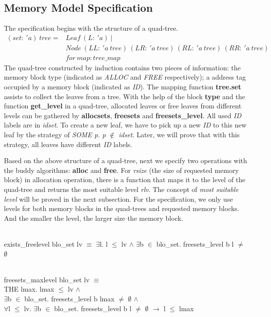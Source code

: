 \subsection{Memory Model Specification}
The specification begins with the structure of a quad-tree.
\begin{align*}
(set:\ 'a)\ tree = &Leaf\ (L:\ 'a)\ | \\
&Node\ (LL:\ 'a\ tree)\ (LR:\ 'a\ tree)\ (RL:\ 'a\ tree)\ (RR:\ 'a\ tree) \\
&for\ map: tree\_map
\end{align*}
The quad-tree constructed by induction contains two pieces of information: the memory block type (indicated as \emph{ALLOC} and \emph{FREE} respectively); a address tag occupied by a memory block (indicated as \emph{ID}). The mapping function \textbf{tree.set} assists to collect the leaves from a tree. With the help of the block \textbf{type} and the function \textbf{get\_level} in a quad-tree, allocated leaves or free leaves from different levels can be gathered by \textbf{allocsets}, \textbf{freesets} and \textbf{freesets\_level}. All used \emph{ID} labels are in \emph{idset}. To create a new leaf, we have to pick up a new \emph{ID} to this new leaf by the strategy of \emph{SOME p. p} $\notin$ \emph{idset}. Later, we will prove that with this strategy, all leaves have different \emph{ID} labels.

Based on the above structure of a quad-tree, next we specify two operations with the buddy algorithms: \textbf{alloc} and \textbf{free}. For \emph{rsize} (the size of requested memory block) in allocation operation, there is a function that maps it to the level of the quad-tree and returns the most suitable level \emph{rlv}. The concept of \emph{most suitable level} will be proved in the next subsection. For the specification, we only use levels for both memory blocks in the quad-trees and requested memory blocks. And the smaller the level, the larger size the memory block.

\begin{definition}  \\
exists\_freelevel blo\_set lv $\equiv$ $\exists$l. l $\leq$ lv $\wedge$ $\exists$b $\in$ blo\_set. freesets\_level b l $\ne$ $\emptyset$
\end{definition}

\begin{definition}  \\
freesets\_maxlevel blo\_set lv $\equiv$ \\
\phantom{x} \hspace{10pt} THE lmax. lmax $\leq$ lv $\wedge$ \\
\phantom{x} \hspace{60pt} $\exists$b $\in$ blo\_set. freesets\_level b lmax $\neq$ $\emptyset$ $\wedge$ \\
\phantom{x} \hspace{60pt} $\forall$l $\leq$ lv. $\exists$b $\in$ blo\_set. freesets\_level b l $\ne$ $\emptyset$ $\longrightarrow$ l $\leq$ lmax
\end{definition}

